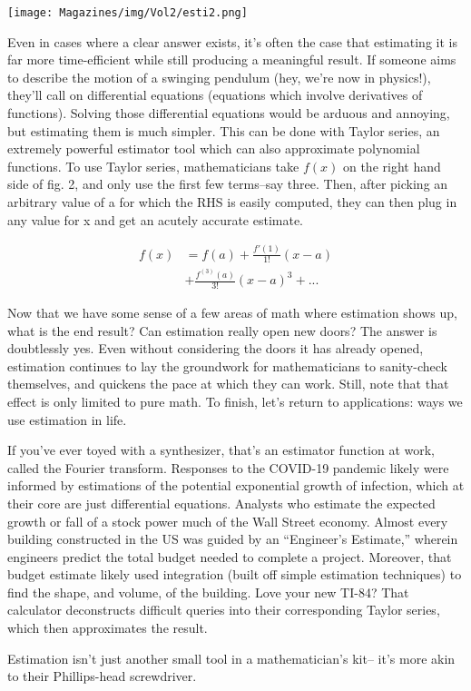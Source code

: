 \documentclass{article}
\begin{document}
\begin{multicols}{3}
\begin{center}
\texttt{[image: Magazines/img/Vol2/esti2.png]}
\end{center}

Even in cases where a clear answer exists, it’s often the case that estimating it is far more time-efficient while still producing a meaningful result. If someone aims to describe the motion of a swinging pendulum (hey, we’re now in physics!), they’ll call on differential equations (equations which involve derivatives of functions). Solving those differential equations would be arduous and annoying, but estimating them is much simpler. This can be done with Taylor series, an extremely powerful estimator tool which can also approximate polynomial functions. To use Taylor series, mathematicians take $f(x)$ on the right hand side of fig. 2, and only use the first few terms–say three. Then, after picking an arbitrary value of a for which the RHS is easily computed, they can then plug in any value for x and get an acutely accurate estimate.

\begin{align*}
    f(x) & =f(a)+\frac{f'(1)}{1!}(x-a)  \\
         & +\frac{f^{(3)}(a)}{3!}(x-a)^3+...
\end{align*} 

Now that we have some sense of a few areas of math where estimation shows up, what is the end result? Can estimation really open new doors? The answer is doubtlessly yes. Even without considering the doors it has already opened, estimation continues to lay the groundwork for mathematicians to sanity-check themselves, and quickens the pace at which they can work. Still, note that that effect is only limited to pure math. To finish, let’s return to applications: ways we use estimation in life.

If you’ve ever toyed with a synthesizer, that’s an estimator function at work, called the Fourier transform. Responses to the COVID-19 pandemic likely were informed by estimations of the potential exponential growth of infection, which at their core are just differential equations. Analysts who estimate the expected growth or fall of a stock power much of the Wall Street economy. Almost every building constructed in the US was guided by an ``Engineer's Estimate,'' wherein engineers predict the total budget needed to complete a project. Moreover, that budget estimate likely used integration (built off simple estimation techniques) to find the shape, and volume, of the building. Love your new TI-84? That calculator deconstructs difficult queries into their corresponding Taylor series, which then approximates the result.

Estimation isn’t just another small tool in a mathematician's kit– it’s more akin to their Phillips-head screwdriver. 


\closearticle
\end{multicols}
\end{document}
